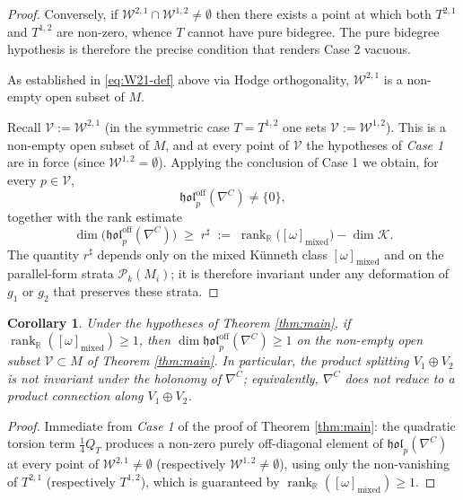 \documentclass[11pt,reqno]{amsart}
\theoremstyle{plain}
\newtheorem{corollary}[theorem]{Corollary}
\theoremstyle{definition}
\numberwithin{equation}{section}
\begin{document}
\begin{proof}
Conversely, if $\mathcal{W}^{2,1}\cap\mathcal{W}^{1,2}\neq\emptyset$
then there exists a point at which both $T^{2,1}$ and $T^{1,2}$ are non-zero, whence $T$ cannot have pure bidegree. The pure bidegree hypothesis is therefore the precise condition that renders Case 2
vacuous.

As established in \eqref{eq:W21-def} above via Hodge orthogonality, $\mathcal{W}^{2,1}$ is a non-empty open subset of $M$.

Recall $\mathcal{V}:=\mathcal{W}^{2,1}$ (in the symmetric case $T = T^{1,2}$ one sets $\mathcal{V} := \mathcal{W}^{1,2}$).  This is a non-empty open subset
of $M$, and at every point of $\mathcal{V}$ the hypotheses of \emph{Case 1} are in force (since $\mathcal{W}^{1,2}=\emptyset$).  Applying the
conclusion of Case 1 we obtain, for every $p\in\mathcal{V}$,
\[
\mathfrak{hol}_{p}^{\mathrm{off}}(\nabla^{C})\neq\{0\},
\]
together with the rank estimate
\[
\dim\bigl(\mathfrak{hol}_p^{\mathrm{off}}(\nabla^{C})\bigr)\;\geq\;
r^\sharp\;:=\;\operatorname{rank}_{\mathbb{R}}\bigl([\omega]_{\mathrm{mixed}}\bigr)-\dim\mathcal{K}.
\]
The quantity $r^{\sharp}$ depends only on the mixed K\"unneth class
$[\omega]_{\mathrm{mixed}}$ and on the parallel-form strata
$\mathcal{P}_{k}(M_{i})$; it is therefore invariant under any
deformation of $g_{1}$ or $g_{2}$ that preserves these strata.
    
\end{proof}

\begin{corollary} Under the hypotheses of Theorem \ref{thm:main}, if $\operatorname{rank}_\mathbb{R}([\omega]_{\mathrm{mixed}}) \geq 1$, then $\dim\mathfrak{hol}^{\mathrm{off}}_p(\nabla^C) \geq 1$ on the non-empty open subset $\mathcal{V} \subset M$ of Theorem \ref{thm:main}. In particular, the product splitting $V_1 \oplus V_2$ is not invariant under the holonomy of $\nabla^C$; equivalently, $\nabla^C$ does not reduce to a product connection along $V_1\oplus V_2$.
\end{corollary}

\begin{proof} Immediate from \emph{Case 1} of the proof of Theorem \ref{thm:main}: the quadratic torsion term $\frac{1}{4}Q_T$ produces a non-zero purely off-diagonal element of $\mathfrak{hol}_p(\nabla^C)$ at every point of $\mathcal{W}^{2,1} \neq \emptyset$ (respectively $\mathcal{W}^{1,2} \neq \emptyset$), using only the non-vanishing of $T^{2,1}$ (respectively $T^{1,2}$), which is guaranteed by $\operatorname{rank}_\mathbb{R}([\omega]_{\mathrm{mixed}}) \geq 1$.
\end{proof}
\end{document}
